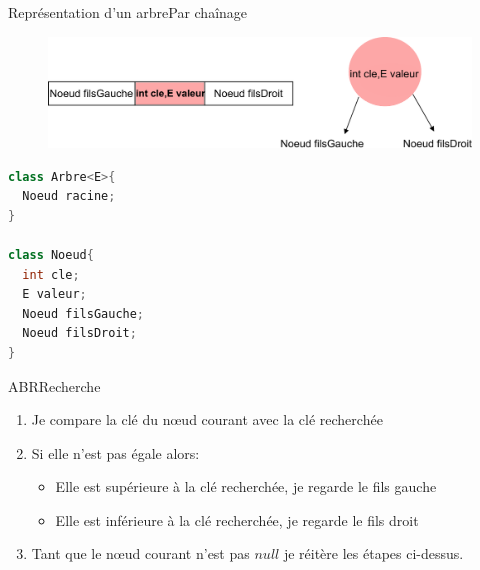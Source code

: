 \documentclass[12pt,a4paper]{beamer}
\begin{document}
\begin{frame}[fragile]{Représentation d'un arbre}{Par chaînage}
\vspace{-2em}
\begin{figure}
\includegraphics[scale=0.55]{figs/tree_chainage_model}
\end{figure}

\begin{lstlisting}[language=Java]
class Arbre<E>{
  Noeud racine;
}

class Noeud{
  int cle;
  E valeur;
  Noeud filsGauche;
  Noeud filsDroit;
}
\end{lstlisting}

\end{frame}





\begin{frame}{ABR}{Recherche}
\begin{enumerate}
\item Je compare la clé du n\oe ud courant avec la clé recherchée
\item Si elle n'est pas égale alors:
\begin{itemize}
\item Elle est supérieure à la clé recherchée, je regarde le fils gauche
\item Elle est inférieure à la clé recherchée, je regarde le fils droit
\end{itemize}
\item Tant que le n\oe ud courant n'est pas $null$ je réitère les étapes ci-dessus.
\end{enumerate}
\end{frame}
\end{document}
